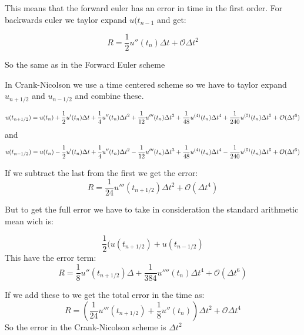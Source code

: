 \documentclass[a4paper,10pt]{article}
\begin{document}
This means that the forward euler has an error in time in the first order. 
For backwards euler we taylor expand $u(t_{n-1}$ and get:

\begin{equation}
  R = \frac{1}{2}u''(t_n)\Delta t + \mathcal{O}\Delta t^2
\end{equation}

So the same as in the Forward Euler scheme

In Crank-Nicolson we use a time centered scheme so we have to taylor expand $u_{n+ 1/2}$ and $u_{n-1/2}$ and combine these. 

\begin{equation}
u(t_{n+1/2}) = u(t_n) + \frac{1}{2} u'(t_n)\Delta t + \frac{1}{4} u''(t_n) \Delta t^2 + \\
\frac{1}{12}u'''(t_n) \Delta t^3 + \frac{1}{48} u^{(4)}(t_n)\Delta t^4 + \\
\frac{1}{240} u^{(5)} (t_n) \Delta t^5 + \mathcal{O}(\Delta t^6)
\end{equation}
and
\begin{equation}
 u(t_{n-1/2}) = u(t_n) - \frac{1}{2} u'(t_n)\Delta t + \frac{1}{4} u''(t_n) \Delta t^2 - \\
\frac{1}{12}u'''(t_n) \Delta t^3 + \frac{1}{48} u^{(4)}(t_n)\Delta t^4 - \\
\frac{1}{240} u^{(5)} (t_n) \Delta t^5 + \mathcal{O}(\Delta t^6)
\end{equation}

If we subtract the last from the first we get the error:
\begin{equation}
 R = \frac{1}{24}u'''(t_{n+1/2})\Delta t^2 + \mathcal{O}(\Delta t^4)
\end{equation}

But to get the full error we have to take in consideration the standard arithmetic mean wich is:

\begin{equation}
 \frac{1}{2}(u(t_{n+1/2}) + u(t_{n - 1/2}) 
\end{equation}
This have the error term:
\begin{equation}
 R = \frac{1}{8}u''(t_{n+1/2})\Delta + \frac{1}{384}u''''(t_n)\Delta t^4 + \mathcal{O}(\Delta t^6)
\end{equation}

If we add these to we get the total error in the time as:
\begin{equation}
 R = (\frac{1}{24} u'''(t_{n+1/2}) + \frac{1}{8}u''(t_n)) \Delta t^2 + \mathcal{O}\Delta t^4 
\end{equation}
So the error in the Crank-Nicolson scheme is $\Delta t^2$
\end{document}
